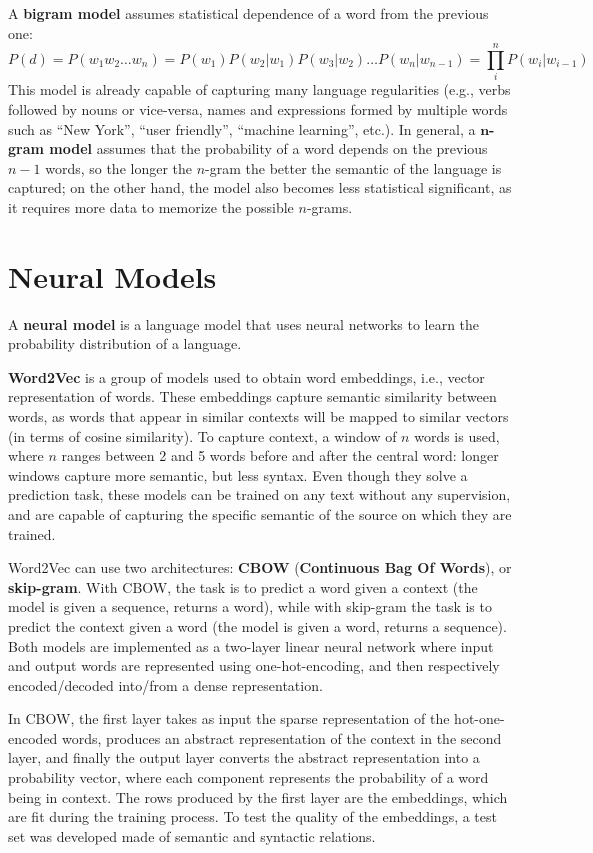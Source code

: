 A \textbf{bigram model} assumes statistical dependence of a word from the previous one:
\begin{equation*}
    P(d) = P(w_1 w_2 \dots w_n) = P(w_1) P(w_2 | w_1) P(w_3 | w_2) \dots P(w_n | w_{n-1}) = \prod_i^n P(w_i | w_{i-1})
\end{equation*}
This model is already capable of capturing many language regularities (e.g., verbs followed by nouns or vice-versa, names and expressions formed by multiple words such as ``New York'', ``user friendly'', ``machine learning'', etc.). In general, a \textbf{$\mathbf{n}$-gram model} assumes that the probability of a word depends on the previous $n-1$ words, so the longer the $n$-gram the better the semantic of the language is captured; on the other hand, the model also becomes less statistical significant, as it requires more data to memorize the possible $n$-grams.

\section{Neural Models}
A \textbf{neural model} is a language model that uses neural networks to learn the probability distribution of a language.

\textbf{Word2Vec} is a group of models used to obtain word embeddings, i.e., vector representation of words. These embeddings capture semantic similarity between words, as words that appear in similar contexts will be mapped to similar vectors (in terms of cosine similarity). To capture context, a window of $n$ words is used, where $n$ ranges between 2 and 5 words before and after the central word: longer windows capture more semantic, but less syntax. Even though they solve a prediction task, these models can be trained on any text without any supervision, and are capable of capturing the specific semantic of the source on which they are trained.

Word2Vec can use two architectures: \textbf{CBOW} (\textbf{Continuous Bag Of Words}), or \textbf{skip-gram}. With CBOW, the task is to predict a word given a context (the model is given a sequence, returns a word), while with skip-gram the task is to predict the context given a word (the model is given a word, returns a sequence). Both models are implemented as a two-layer linear neural network where input and output words are represented using one-hot-encoding, and then respectively encoded/decoded into/from a dense representation.

In CBOW, the first layer takes as input the sparse representation of the hot-one-encoded words, produces an abstract representation of the context in the second layer, and finally the output layer converts the abstract representation into a probability vector, where each component represents the probability of a word being in context. The rows produced by the first layer are the embeddings, which are fit during the training process. To test the quality of the embeddings, a test set was developed made of semantic and syntactic relations.

